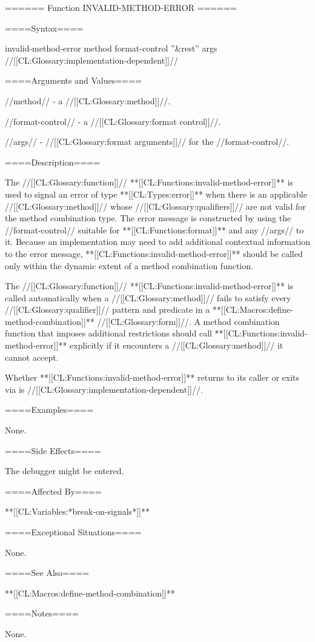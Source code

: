 ====== Function INVALID-METHOD-ERROR ======

====Syntax====

\DefunWithValues invalid-method-error {method format-control ''&rest'' args} {//[[CL:Glossary:implementation-dependent]]//}

====Arguments and Values====

//method// - a //[[CL:Glossary:method]]//.


//format-control// - a //[[CL:Glossary:format control]]//.


//args// - //[[CL:Glossary:format arguments]]// for the //format-control//.

====Description====

The //[[CL:Glossary:function]]// **[[CL:Functions:invalid-method-error]]** is used to signal an error of type **[[CL:Types:error]]** when there is an applicable //[[CL:Glossary:method]]// whose //[[CL:Glossary:qualifiers]]// are not valid for the method combination type. The error message is constructed by using the //format-control// suitable for **[[CL:Functions:format]]** and any //args// to it. Because an implementation may need to add additional contextual information to the error message, **[[CL:Functions:invalid-method-error]]** should be called only within the dynamic extent of a method combination function.

The //[[CL:Glossary:function]]// **[[CL:Functions:invalid-method-error]]** is called automatically when a //[[CL:Glossary:method]]// fails to satisfy every //[[CL:Glossary:qualifier]]// pattern and predicate in a **[[CL:Macros:define-method-combination]]** //[[CL:Glossary:form]]//. A method combination function that imposes additional restrictions should call **[[CL:Functions:invalid-method-error]]** explicitly if it encounters a //[[CL:Glossary:method]]// it cannot accept.


Whether **[[CL:Functions:invalid-method-error]]** returns to its caller or exits via  is //[[CL:Glossary:implementation-dependent]]//.

====Examples====

None.

====Side Effects====

The debugger might be entered.

====Affected By====

**[[CL:Variables:*break-on-signals*]]**

====Exceptional Situations====

None.

====See Also====

**[[CL:Macros:define-method-combination]]**


====Notes====

None.



